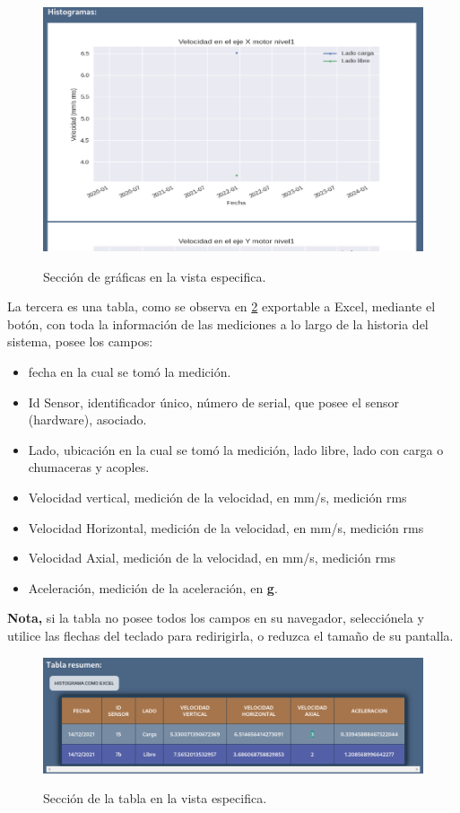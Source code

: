 \documentclass[12pt]{article}
\begin{document}
    \begin{figure}[H]
		\centering
        \caption{Sección de gráficas en la vista especifica. }
        \includegraphics[width=\linewidth]{ManualUsuario/especificaGraficas.png}
        \label{img:especificaGraficasManual}
	\end{figure}

La tercera es una tabla, como se observa en \ref{img:especificaTablaManual}
exportable a Excel, mediante el botón, con toda la información de las mediciones
a lo largo de la historia del sistema, posee los campos:
\begin{itemize}
    \item fecha en la cual se tomó la medición.
    \item Id Sensor, identificador único, número de serial, que posee el sensor
        (hardware), asociado.
    \item Lado, ubicación en la cual se tomó la medición, lado libre, lado con
        carga o chumaceras y acoples.
    \item Velocidad vertical, medición de la velocidad, en mm/s, medición rms
    \item Velocidad Horizontal, medición de la velocidad, en mm/s, medición rms
    \item Velocidad Axial, medición de la velocidad, en mm/s, medición rms
    \item Aceleración, medición de la aceleración, en \textbf{g}.
\end{itemize}

\textbf{Nota,} si la tabla no posee todos los campos en su navegador, selecciónela
y utilice las flechas del teclado para redirigirla, o reduzca el tamaño de su
pantalla.

    \begin{figure}[H]
		\centering
        \caption{Sección de la tabla en la vista especifica. }
        \includegraphics[width=\linewidth]{ManualUsuario/especificaTabla.png}
        \label{img:especificaTablaManual}
	\end{figure}
\end{document}
